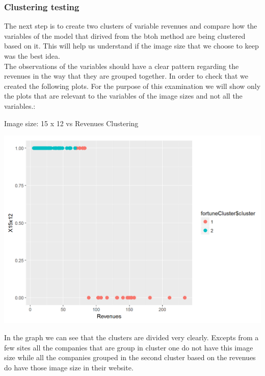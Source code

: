 \documentclass{book}
\begin{document}
\subsubsection{Clustering testing}
The next step is to create two clusters of variable revenues and compare how the variables of the model that dirived from the btoh method are being clustered based on it. This will help us understand if the image size that we choose to keep was the best idea.\\
The observations of the variables should have a clear pattern regarding the revenues in the way that they are grouped together. In order to check that we created the following plots. For the purpose of this examination we will show only the plots that are relevant to the variables of the image sizes and not all the variables.:
\begin{table}[H]
\centering
\caption{Image size: 15 x 12 vs Revenues Clustering}
\begin{center}
\includegraphics[scale=0.6]{../R/photos/96_clust_15x12_new_this.png}   \\
\end{center}
\end{table}
In the graph we can see that the clusters are divided very clearly. Excepts from a few sites all the companies that are group in cluster one do not have this image size while all the companies grouped in the second cluster based on the revenues do have those image size in their website.
\end{document}
